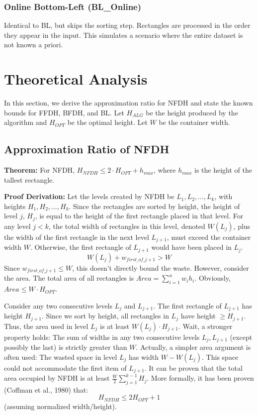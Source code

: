 \documentclass[a4paper,12pt]{article}
\begin{document}
\subsubsection{Online Bottom-Left (BL\_Online)}
Identical to BL, but skips the sorting step. Rectangles are processed in the order they appear in the input. This simulates a scenario where the entire dataset is not known a priori.

\section{Theoretical Analysis}
In this section, we derive the approximation ratio for NFDH and state the known bounds for FFDH, BFDH, and BL. Let $H_{ALG}$ be the height produced by the algorithm and $H_{OPT}$ be the optimal height. Let $W$ be the container width.

\subsection{Approximation Ratio of NFDH}
\textbf{Theorem:} For NFDH, $H_{NFDH} \le 2 \cdot H_{OPT} + h_{max}$, where $h_{max}$ is the height of the tallest rectangle.

\textbf{Proof Derivation:}
Let the levels created by NFDH be $L_1, L_2, \dots, L_k$, with heights $H_1, H_2, \dots, H_k$.
Since the rectangles are sorted by height, the height of level $j$, $H_j$, is equal to the height of the first rectangle placed in that level.
For any level $j < k$, the total width of rectangles in this level, denoted $W(L_j)$, plus the width of the first rectangle in the next level $L_{j+1}$, must exceed the container width $W$. Otherwise, the first rectangle of $L_{j+1}$ would have been placed in $L_j$.
\[ W(L_j) + w_{first\_of\_j+1} > W \]
Since $w_{first\_of\_j+1} \le W$, this doesn't directly bound the waste. However, consider the area.
The total area of all rectangles is $Area = \sum_{i=1}^n w_i h_i$.
Obviously, $Area \le W \cdot H_{OPT}$.

Consider any two consecutive levels $L_j$ and $L_{j+1}$.
The first rectangle of $L_{j+1}$ has height $H_{j+1}$. Since we sort by height, all rectangles in $L_j$ have height $\ge H_{j+1}$.
Thus, the area used in level $L_j$ is at least $W(L_j) \cdot H_{j+1}$.
Wait, a stronger property holds: The sum of widths in any two consecutive levels $L_j, L_{j+1}$ (except possibly the last) is strictly greater than $W$.
Actually, a simpler area argument is often used:
The wasted space in level $L_j$ has width $W - W(L_j)$. This space could not accommodate the first item of $L_{j+1}$.
It can be proven that the total area occupied by NFDH is at least $\frac{W}{2} \sum_{j=1}^{k-1} H_j$.
More formally, it has been proven (Coffman et al., 1980) that:
\[ H_{NFDH} \le 2 H_{OPT} + 1 \]
(assuming normalized width/height).
\end{document}
